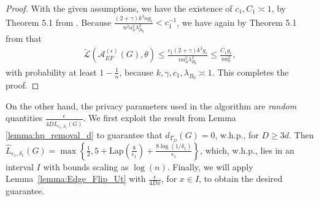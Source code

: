 \documentclass{article}
\begin{document}
\begin{proof}
With the given assumptions, we have the existence of $c_1, C_1 \asymp 1$, by Theorem 5.1 from \cite{HehEtal22}. Because $\frac{(2 + \gamma)k^3ng_\epsilon}{n^2a_n ^2\lambda_{B_0}^2} < c_1^{-1}$, we have again by Theorem 5.1 from \cite{HehEtal22} that
\begin{align*}
\widetilde{\mathcal{L}}\left(\mathcal{A}_{EF}^{(\epsilon)}(G), \theta\right) \leq \frac{c_1(2 + \gamma)k^3g_\epsilon}{na_n^2\lambda_{B_0}^2} \leq \frac{C_1g_\epsilon}{na_n^2},
\end{align*}
with probability at least $1 - \frac{1}{n}$, because $k, \gamma, c_1, \lambda_{B_0} \asymp 1$. This completes the proof.
\end{proof}

On the other hand, the privacy parameters used in the algorithm are \emph{random} quantities $\frac{\epsilon}{4D\hat{L}_{\epsilon_1, \delta_1}(G)}$. We first exploit the result from Lemma \ref{lemma:hp_removal_d} to guarantee that $d_{T_{D}}(G) = 0$, w.h.p., for $D \geq 3d$. Then $\hat{L}_{\epsilon_1, \delta_1}(G) = \max\left\{\frac{1}{2}, 5 + \mathrm{Lap}\left(\frac{8}{\epsilon_1}\right) + \frac{8\log(1/\delta_1)}{\epsilon_1}\right\}$, which, w.h.p., lies in an interval $I$ with bounds scaling as $\log(n)$. Finally, we will apply Lemma~\ref{lemma:Edge_Flip_Ut} with $\frac{\epsilon}{4Dx}$, for $x \in I$, to obtain the desired guarantee.
\end{document}
